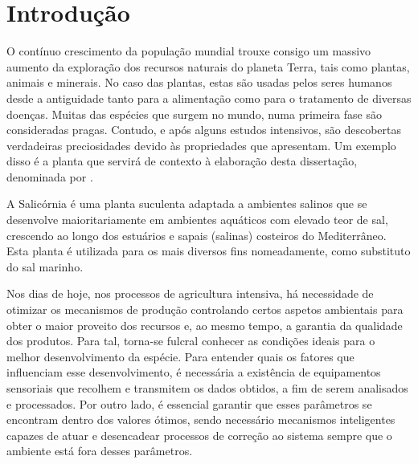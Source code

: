 \chapter{Introdução}



O contínuo crescimento da população mundial trouxe consigo um massivo aumento da exploração dos recursos naturais do planeta Terra, tais como plantas, animais e minerais. No caso das plantas, estas são usadas pelos seres humanos desde a antiguidade tanto para a alimentação como para o tratamento de diversas doenças. Muitas das espécies que surgem no mundo, numa primeira fase são consideradas pragas. Contudo, e após alguns estudos intensivos, são descobertas verdadeiras preciosidades devido às propriedades que apresentam. Um exemplo disso é a planta que servirá de contexto à elaboração desta dissertação, denominada por \sr. 









A Salicórnia é uma planta suculenta adaptada a ambientes salinos que se desenvolve maioritariamente em ambientes aquáticos com elevado teor de sal, crescendo ao longo dos estuários e sapais (salinas) costeiros do Mediterrâneo. Esta planta é utilizada para os mais diversos fins nomeadamente, como substituto do sal marinho. 


Nos dias de hoje, nos processos de agricultura intensiva, há necessidade de otimizar os mecanismos de produção controlando certos aspetos ambientais para obter o maior proveito dos recursos e, ao mesmo tempo, a garantia da qualidade dos produtos. Para tal, torna-se fulcral conhecer as condições ideais para o melhor desenvolvimento da espécie. Para entender quais os fatores que influenciam esse desenvolvimento, é necessária a existência de equipamentos sensoriais que recolhem e transmitem os dados obtidos, a fim de serem analisados e processados. Por outro lado, é essencial garantir que esses parâmetros se encontram dentro dos valores ótimos, sendo necessário mecanismos inteligentes capazes de atuar e desencadear processos de correção ao sistema sempre que o ambiente está fora desses parâmetros. 



